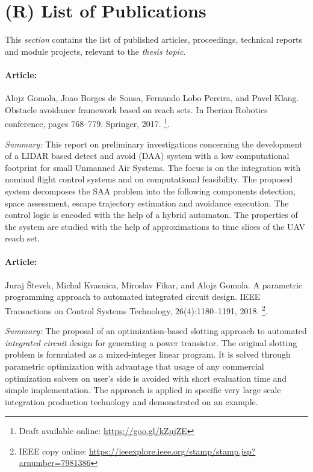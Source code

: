 \section{(R) List of Publications}\label{sec:listOfPublications}

\noindent This \emph{section} contains the list of published articles, proceedings, technical reports and module projects, relevant to the \emph{thesis topic}.

\paragraph{Article:} Alojz Gomola, Joao Borges de Sousa, Fernando Lobo Pereira, and Pavel Klang. Obstacle avoidance framework based on reach sets. In Iberian Robotics conference, pages 768–779. Springer, 2017. \cite{gomola2017obstacle}\footnote{Draft available online: \url{https://goo.gl/kZujZE}}.

\emph{Summary:} This report on preliminary investigations concerning the development of a LIDAR based detect and avoid (DAA) system with a low computational footprint for small Unmanned Air Systems. The focus is on the integration with nominal flight control systems and on computational feasibility. The proposed system decomposes the SAA problem into the following components detection, space assessment, escape trajectory estimation and avoidance execution. The control logic is encoded with the help of a hybrid automaton. The properties of the system are studied with the help of approximations to time slices of the UAV reach set.


\paragraph{Article:}  Juraj {\v{S}}tevek,  Michal  Kvasnica,  Miroslav  Fikar,  and  Alojz  Gomola. A  parametric programming  approach  to  automated  integrated  circuit  design. IEEE Transactions on Control Systems Technology, 26(4):1180–1191, 2018. \cite{vstevek2018parametric}\footnote{IEEE copy online: \url{https://ieeexplore.ieee.org/stamp/stamp.jsp?arnumber=7981386}}.

\emph{Summary:} The proposal of an optimization-based slotting approach to automated \emph{integrated circuit} design for generating a power transistor. The original slotting problem is formulated as a mixed-integer linear program. It is solved through parametric optimization with advantage that usage of any commercial optimization solvers on user’s side is avoided with short evaluation time and simple implementation. The approach is applied in specific very large scale integration production technology and demonstrated on an example.

